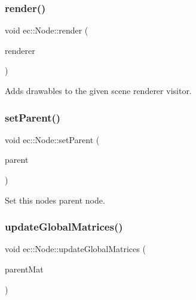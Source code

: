 \subsubsection{\texorpdfstring{render()}{render()}}
{\footnotesize\ttfamily void ec\+::\+Node\+::render (\begin{DoxyParamCaption}\item[{\mbox{\hyperlink{classec_1_1_scene_renderer}{Scene\+Renderer}} \&}]{renderer }\end{DoxyParamCaption})\hspace{0.3cm}{\ttfamily [virtual]}}



Adds drawables to the given scene renderer visitor. 

\mbox{\label{classec_1_1_node_a3c908e5f01e989cedfba5dc1a3ed66c1}} 
\subsubsection{\texorpdfstring{set\+Parent()}{setParent()}}
{\footnotesize\ttfamily void ec\+::\+Node\+::set\+Parent (\begin{DoxyParamCaption}\item[{\mbox{\hyperlink{classec_1_1_node}{Node}} $\ast$}]{parent }\end{DoxyParamCaption})}



Set this node\textquotesingle{}s parent node. 

\mbox{\label{classec_1_1_node_a12a9b14ccc434c52404e262ef5db6f80}} 
\subsubsection{\texorpdfstring{update\+Global\+Matrices()}{updateGlobalMatrices()}}
{\footnotesize\ttfamily void ec\+::\+Node\+::update\+Global\+Matrices (\begin{DoxyParamCaption}\item[{const glm\+::mat4 \&}]{parent\+Mat }\end{DoxyParamCaption})\hspace{0.3cm}{\ttfamily [virtual]}}



